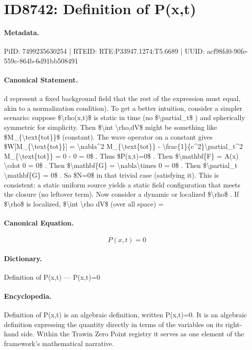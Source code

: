 \section*{ID8742: Definition of P(x,t)}
\paragraph{Metadata.}
PiID: 7499235630254 | RTEID: RTE:P33947.1274:T5.6689 | UUID: acf98fd0-90fe-559c-864b-6d91bb508491

\paragraph{Canonical Statement.}
d represent a fixed background field that the rest of the expression must equal, akin to a normalization condition). To get a better intuition, consider a simpler scenario: suppose \$\textbackslash{}rho(x,t)\$ is static in time (no \$\textbackslash{}partial\_t\$ ) and spherically symmetric for simplicity. Then \$\textbackslash{}int \textbackslash{}rho,dV\$ might be something like \$M\_\{\textbackslash{}text\{tot\}\}\$ (constant). The wave operator on a constant gives \$W[M\_\{\textbackslash{}text\{tot\}\}] = \textbackslash{}nabla\textasciicircum{}2 M\_\{\textbackslash{}text\{tot\}\} - \textbackslash{}frac\{1\}\{c\textasciicircum{}2\}\textbackslash{}partial\_t\textasciicircum{}2 M\_\{\textbackslash{}text\{tot\}\} = 0 - 0 = 0\$ . Thus \$P(x,t)=0\$ . Then \$\textbackslash{}mathbf\{F\} = A(x) \textbackslash{}cdot 0 = 0\$ . Then \$\textbackslash{}mathbf\{G\} = \textbackslash{}nabla\textbackslash{}times 0 = 0\$ . Then \$\textbackslash{}partial\_t \textbackslash{}mathbf\{G\} = 0\$ . So \$N=0\$ in that trivial case (satisfying it). This is consistent: a static uniform source yields a static field configuration that meets the closure (no leftover term). Now consider a dynamic or localized \$\textbackslash{}rho\$ . If \$\textbackslash{}rho\$ is localized, \$\textbackslash{}int \textbackslash{}rho dV\$ (over all space) =

\paragraph{Canonical Equation.}
\[
P(x,t)=0
\]

\paragraph{Dictionary.}
Definition of P(x,t) — P(x,t)=0

\paragraph{Encyclopedia.}
Definition of P(x,t) is an algebraic definition, written P(x,t)=0. It is an algebraic definition expressing the quantity directly in terms of the variables on its right-hand side. Within the Trawin Zero Point registry it serves as one element of the framework's mathematical narrative.
